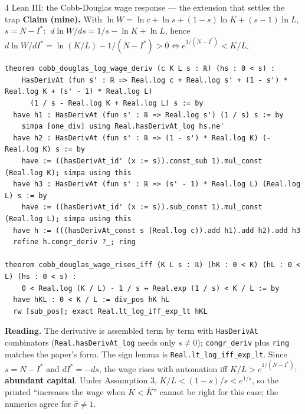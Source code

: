 \documentclass[aspectratio=169,11pt]{beamer}
\begin{document}
\begin{frame}[fragile]{4 \textperiodcentered{} Lean III: the Cobb-Douglas wage response --- the extension that settles the trap}
  \scriptsize
  \textbf{Claim (mine).} With $\ln W=\ln c+\ln s+(1-s)\ln K+(s-1)\ln L$, $s=N-I^*$:
  $\ d\ln W/ds=1/s-\ln K+\ln L$, hence $d\ln W/dI^*=\ln(K/L)-1/(N-I^*)>0\iff e^{1/(N-I^*)}<K/L$.
  \vspace{-2pt}
  \begin{lstlisting}[basicstyle=\ttfamily\tiny]
theorem cobb_douglas_log_wage_deriv (c K L s : ℝ) (hs : 0 < s) :
    HasDerivAt (fun s' : ℝ => Real.log c + Real.log s' + (1 - s') * Real.log K + (s' - 1) * Real.log L)
      (1 / s - Real.log K + Real.log L) s := by
  have h1 : HasDerivAt (fun s' : ℝ => Real.log s') (1 / s) s := by
    simpa [one_div] using Real.hasDerivAt_log hs.ne'
  have h2 : HasDerivAt (fun s' : ℝ => (1 - s') * Real.log K) (-Real.log K) s := by
    have := ((hasDerivAt_id' (x := s)).const_sub 1).mul_const (Real.log K); simpa using this
  have h3 : HasDerivAt (fun s' : ℝ => (s' - 1) * Real.log L) (Real.log L) s := by
    have := ((hasDerivAt_id' (x := s)).sub_const 1).mul_const (Real.log L); simpa using this
  have h := (((hasDerivAt_const s (Real.log c)).add h1).add h2).add h3
  refine h.congr_deriv ?_; ring

theorem cobb_douglas_wage_rises_iff (K L s : ℝ) (hK : 0 < K) (hL : 0 < L) (hs : 0 < s) :
    0 < Real.log (K / L) - 1 / s ↔ Real.exp (1 / s) < K / L := by
  have hKL : 0 < K / L := div_pos hK hL
  rw [sub_pos]; exact Real.lt_log_iff_exp_lt hKL
  \end{lstlisting}
  \vspace{-4pt}
  \textbf{Reading.} The derivative is assembled term by term with \texttt{HasDerivAt} combinators
  (\texttt{Real.hasDerivAt\_log} needs only $s\neq0$); \texttt{congr\_deriv} plus \texttt{ring} matches the paper's
  form. The sign lemma is \texttt{Real.lt\_log\_iff\_exp\_lt}. Since $s=N-I^*$ and $dI^*=-ds$, the wage rises with
  automation iff $K/L>e^{1/(N-I^*)}$: \textbf{abundant capital}. Under Assumption 3, $K/L<(1-s)/s<e^{1/s}$, so
  the printed ``increases the wage when $K<\bar K$'' cannot be right for this case; the numerics agree for $\hat\sigma\neq1$.
\end{frame}
\end{document}
